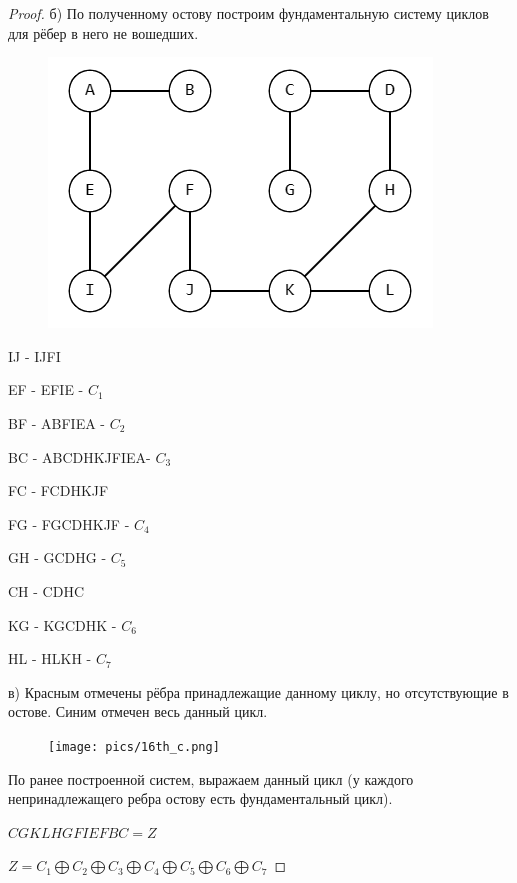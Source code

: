 \begin{proof}
    
    б) По полученному остову построим фундаментальную систему циклов для рёбер в него не вошедших.

    \begin{figure}[h]
    \centering
     \includegraphics[width=0.4\linewidth]{pics/16th_a_solution.png}
     \label{fig:dm}
    \end{figure}

    IJ - IJFI

    EF - EFIE - $C_1$

    BF - ABFIEA - $C_2$ 

    BC - ABCDHKJFIEA- $C_3$

    FC - FCDHKJF

    FG - FGCDHKJF - $C_4$

    GH - GCDHG - $C_5$

    CH - CDHC

    KG - KGCDHK - $C_6$

    HL - HLKH - $C_7$

    в) Красным отмечены рёбра принадлежащие данному циклу, но отсутствующие в остове. Синим отмечен весь данный цикл.

    \begin{figure}[h]
    \centering
     \texttt{[image: pics/16th\_с.png]}
     \label{fig:dm}
    \end{figure}

    По ранее построенной систем, выражаем данный цикл (у каждого непринадлежащего ребра остову есть фундаментальный цикл).
    
    $CGKLHGFIEFBC = Z$
    
    $Z = C_1\bigoplus C_2\bigoplus C_3\bigoplus C_4\bigoplus C_5\bigoplus C_6\bigoplus C_7$
    
\end{proof}
